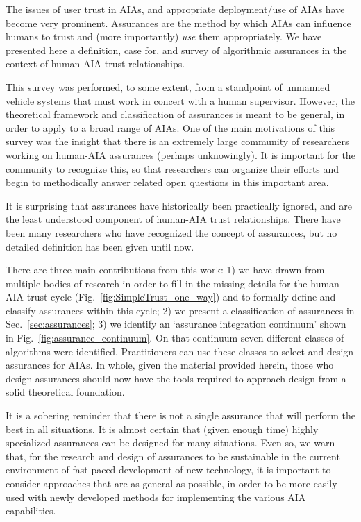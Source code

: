 The issues of user trust in AIAs, and appropriate deployment/use of AIAs have become very prominent. Assurances are the method by which AIAs can influence humans to trust and (more importantly) \emph{use} them appropriately. We have presented here a definition, case for, and survey of algorithmic assurances in the context of human-AIA trust relationships. 
    
This survey was performed, to some extent, from a standpoint of unmanned vehicle systems that must work in concert with a human supervisor. However, the theoretical framework and classification of assurances is meant to be general, in order to apply to a broad range of AIAs. One of the main motivations of this survey was the insight that there is an extremely large community of researchers working on human-AIA assurances (perhaps unknowingly). It is important for the community to recognize this, so that researchers can organize their efforts and begin to methodically answer related open questions in this important area.

It is surprising that assurances have historically been practically ignored, and are the least understood component of human-AIA trust relationships. There have been many researchers who have recognized the concept of assurances, but no detailed definition has been given until now.

There are three main contributions from this work: 1) we have drawn from multiple bodies of research in order to fill in the missing details for the human-AIA trust cycle (Fig.~\ref{fig:SimpleTrust_one_way}) and to formally define and classify assurances within this cycle; 2) we present a classification of assurances in Sec.~\ref{sec:assurances}; 3) we identify an `assurance integration continuum' shown in Fig.~\ref{fig:assurance_continuum}. On that continuum seven different classes of algorithms were identified. Practitioners can use these classes to select and design assurances for AIAs. In whole, given the material provided herein, those who design assurances should now have the tools required to approach design from a solid theoretical foundation.

It is a sobering reminder that there is not a single assurance that will perform the best in all situations. It is almost certain that (given enough time) highly specialized assurances can be designed for many situations. Even so, we warn that, for the research and design of assurances to be sustainable in the current environment of fast-paced development of new technology, it is important to consider approaches that are as general as possible, in order to be more easily used with newly developed methods for implementing the various AIA capabilities.

